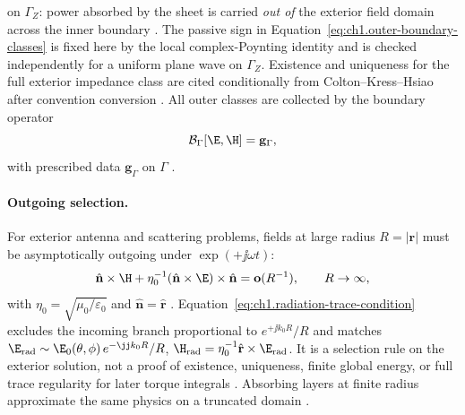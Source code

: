 on $\Gamma_Z$: power absorbed by the sheet is carried \emph{out of} the exterior field domain across the inner boundary \cite{stratton1941,harrington2001}. The passive sign in Equation~\eqref{eq:ch1.outer-boundary-classes} is fixed here by the local complex-Poynting identity and is checked independently for a uniform plane wave on $\Gamma_Z$. Existence and uniqueness for the full exterior impedance class are cited conditionally from Colton--Kress--Hsiao after convention conversion \cite{colton1981impedance}. All outer classes are collected by the boundary operator
\begin{equation}
\label{eq:ch1.boundary-data-operator}
\mathcal{B}_\Gamma[\E,\H]=\mathbf{g}_\Gamma,
\end{equation}
with prescribed data $\mathbf{g}_\Gamma$ on $\Gamma$ \cite{stratton1941}.
\label{eq:ch1.data-specification-tuple}

\paragraph{Outgoing selection.}
For exterior antenna and scattering problems, fields at large radius $R=|\mathbf{r}|$ must be asymptotically outgoing under $\exp(+\jj\omega t)$:
\begin{equation}
\label{eq:ch1.radiation-trace-condition}
\hat{\mathbf{n}}\times\H
+\eta_0^{-1}(\hat{\mathbf{n}}\times\E)\times\hat{\mathbf{n}}
=\mathbf{o}(R^{-1}),\qquad R\to\infty,
\end{equation}
with $\eta_0=\sqrt{\mu_0/\varepsilon_0}$ and $\hat{\mathbf{n}}=\hat{\mathbf{r}}$ \cite{stratton1941,sommerfeld1949}. Equation~\eqref{eq:ch1.radiation-trace-condition} excludes the incoming branch proportional to $e^{+\jj k_0 R}/R$ and matches $\E_{\mathrm{rad}}\sim \E_0(\theta,\phi)\,e^{-\jj k_0 R}/R$, $\H_{\mathrm{rad}}=\eta_0^{-1}\hat{\mathbf{r}}\times\E_{\mathrm{rad}}$. It is a selection rule on the exterior solution, not a proof of existence, uniqueness, finite global energy, or full trace regularity for later torque integrals \cite{harrington2001}. Absorbing layers at finite radius approximate the same physics on a truncated domain \cite{hansen1988}.

